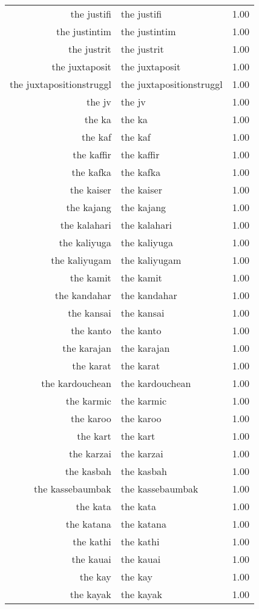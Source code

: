 \begin{table}[ht]
\begin{tabular}{rlr}
  the justifi & the justifi & 1.00 \\ 
  the justintim & the justintim & 1.00 \\ 
  the justrit & the justrit & 1.00 \\ 
  the juxtaposit & the juxtaposit & 1.00 \\ 
  the juxtapositionstruggl & the juxtapositionstruggl & 1.00 \\ 
  the jv & the jv & 1.00 \\ 
  the ka & the ka & 1.00 \\ 
  the kaf & the kaf & 1.00 \\ 
  the kaffir & the kaffir & 1.00 \\ 
  the kafka & the kafka & 1.00 \\ 
  the kaiser & the kaiser & 1.00 \\ 
  the kajang & the kajang & 1.00 \\ 
  the kalahari & the kalahari & 1.00 \\ 
  the kaliyuga & the kaliyuga & 1.00 \\ 
  the kaliyugam & the kaliyugam & 1.00 \\ 
  the kamit & the kamit & 1.00 \\ 
  the kandahar & the kandahar & 1.00 \\ 
  the kansai & the kansai & 1.00 \\ 
  the kanto & the kanto & 1.00 \\ 
  the karajan & the karajan & 1.00 \\ 
  the karat & the karat & 1.00 \\ 
  the kardouchean & the kardouchean & 1.00 \\ 
  the karmic & the karmic & 1.00 \\ 
  the karoo & the karoo & 1.00 \\ 
  the kart & the kart & 1.00 \\ 
  the karzai & the karzai & 1.00 \\ 
  the kasbah & the kasbah & 1.00 \\ 
  the kassebaumbak & the kassebaumbak & 1.00 \\ 
  the kata & the kata & 1.00 \\ 
  the katana & the katana & 1.00 \\ 
  the kathi & the kathi & 1.00 \\ 
  the kauai & the kauai & 1.00 \\ 
  the kay & the kay & 1.00 \\ 
  the kayak & the kayak & 1.00 \\ 

\end{tabular}
\end{table}
